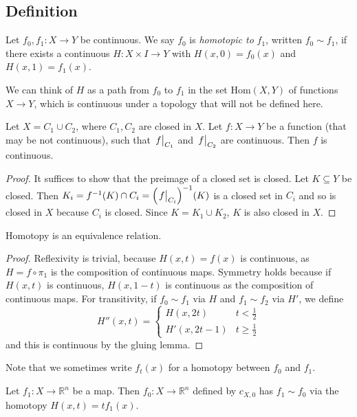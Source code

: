 \subsection{Definition}
\begin{definition}
	Let \( f_0, f_1 \colon X \to Y \) be continuous.
	We say \( f_0 \) is \emph{homotopic to} \( f_1 \), written \( f_0 \sim f_1 \), if there exists a continuous \( H \colon X \times I \to Y \) with \( H(x,0) = f_0(x) \) and \( H(x,1) = f_1(x) \).
\end{definition}
We can think of \( H \) as a path from \( f_0 \) to \( f_1 \) in the set \( \mathrm{Hom}(X,Y) \) of functions \( X \to Y \), which is continuous under a topology that will not be defined here.
\begin{lemma}
	Let \( X = C_1 \cup C_2 \), where \( C_1, C_2 \) are closed in \( X \).
	Let \( f \colon X \to Y \) be a function (that may be not continuous), such that \( \eval{f}_{C_1} \) and \( \eval{f}_{C_2} \) are continuous.
	Then \( f \) is continuous.
\end{lemma}
\begin{proof}
	It suffices to show that the preimage of a closed set is closed.
	Let \( K \subseteq Y \) be closed.
	Then \( K_i = f^{-1}(K) \cap C_i = \qty(\eval{f}_{C_i})^{-1}(K) \) is a closed set in \( C_i \) and so is closed in \( X \) because \( C_i \) is closed.
	Since \( K = K_1 \cup K_2 \), \( K \) is also closed in \( X \).
\end{proof}
\begin{lemma}
	Homotopy is an equivalence relation.
\end{lemma}
\begin{proof}
	Reflexivity is trivial, because \( H(x,t) = f(x) \) is continuous, as \( H = f \circ \pi_1 \) is the composition of continuous maps.
	Symmetry holds because if \( H(x,t) \) is continuous, \( H(x,1-t) \) is continuous as the composition of continuous maps.
	For transitivity, if \( f_0 \sim f_1 \) via \( H \) and \( f_1 \sim f_2 \) via \( H' \), we define
	\[ H''(x,t) = \begin{cases}
		H(x,2t) & t < \frac{1}{2} \\
		H'(x,2t-1) & t \geq \frac{1}{2}
	\end{cases} \]
	and this is continuous by the gluing lemma.
\end{proof}
Note that we sometimes write \( f_t(x) \) for a homotopy between \( f_0 \) and \( f_1 \).
\begin{example}
	Let \( f_1 \colon X \to \mathbb R^n \) be a map. Then \( f_0 \colon X \to \mathbb R^n \) defined by \( c_{X,0} \) has \( f_1 \sim f_0 \) via the homotopy \( H(x,t) = t f_1(x) \).
\end{example}
